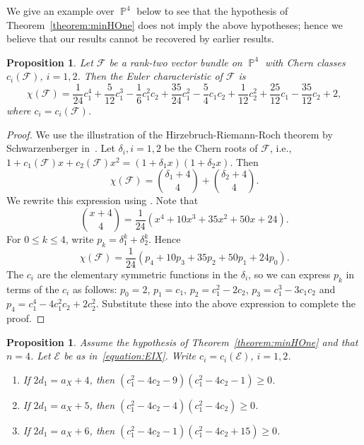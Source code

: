 \documentclass[11pt,a4paper]{amsart}
\theoremstyle{plain}
\newtheorem{proposition}[equation]{Proposition}
\theoremstyle{definition}
\newcommand{\calE}{\mathcal E}
\newcommand{\calF}{\mathcal F}
\DeclareMathOperator{\projective}{\mathbb{P}}
\begin{document}
We give an example over $\projective^4$ below to see that the hypothesis of
Theorem~\ref{theorem:minHOne} does not imply the above hypotheses; hence we
believe that our results cannot be recovered by earlier results.

\begin{proposition}
\label{proposition:calF}
Let $\calF$ be a rank-two vector bundle on $\projective^4$ with Chern
classes $c_i(\calF)$, $i =1, 2$. 
Then the Euler characteristic of $\calF$ is
\[
%
\chi(\calF) = 
\frac 1{24} c_1^4 + \frac5{12} c_1^3 - \frac 16 c_1^2c_2 + 
\frac{35}{24}c_1^2 - \frac54c_1c_2 + \frac 1{12} c_2^2 + 
\frac{25}{12}c_1 - \frac{35}{12}c_2 +2,
\]
where $c_i = c_i(\calF)$. 
\end{proposition}

\begin{proof}
%
We use the illustration of the Hirzebruch-Riemann-Roch theorem by
Schwarzenberger in~\cite[\S 22.4, Appendix One]{HirzebruchTMAG1995}.
Let $\delta_i, i=1,2$ be the Chern roots
of $\calF$, i.e., $\displaystyle 1 + c_1(\calF) x + c_2(\calF) x^2
= (1 + \delta_1x ) (1 + \delta_2x )$.
Then
\[
\chi(\calF) = \binom{\delta_1 + 4}{4} + \binom{\delta_2 + 4}{4}.
\]
We rewrite this expression using \cite[Example 15.1.2]{FultonIntThy1998}.
Note that 
\[
\binom{x + 4}{4} = 
\frac{1} {24} ( x^4 + 10x^3 + 35 x^2 + 50x + 24).
\]
For $0 \leq k \leq 4$, write $p_k = \delta_1^k + \delta_2^k$.
Hence
\[
\chi(\calF) = 
\frac{1} {24} ( p_4 + 10p_3 + 35 p_2 + 50p_1 + 24p_0).
\]
The $c_i$ are the elementary symmetric functions in the $\delta_i$, so we
can express $p_k$ in terms of the $c_i$ as follows:
$p_0 = 2$,
$p_1 = c_1$,
$p_2 = c_1^2 - 2 c_2$,
$p_3 = c_1^3 - 3 c_1 c_2$ and
$p_4 = c_1^4 - 4 c_1^2 c_2 + 2 c_2^2$.
Substitute these into the above expression to complete the proof.
\end{proof}

\begin{proposition}
\label{proposition:calE}
Assume the hypothesis of Theorem~\ref{theorem:minHOne} and that $n=4$.
Let $\calE$ be as in~\eqref{equation:EIX}.
Write $c_i = c_i(\calE)$, $i=1,2$.
\begin{enumerate}

\item
%
If $2d_1=a_X+4$, then 
$(c_1^2 - 4 c_2 - 9)(c_1^2 - 4 c_2 - 1) \geq 0$.

\item
%
If $2d_1=a_X+5$, then 
$(c_1^2 - 4 c_2 - 4)(c_1^2 - 4 c_2 ) \geq 0$.

\item
%
If $2d_1=a_X+6$, then 
$(c_1^2 - 4 c_2 - 1)(c_1^2 - 4 c_2 + 15 ) \geq 0$.

\end{enumerate}

\end{proposition}
\end{document}
